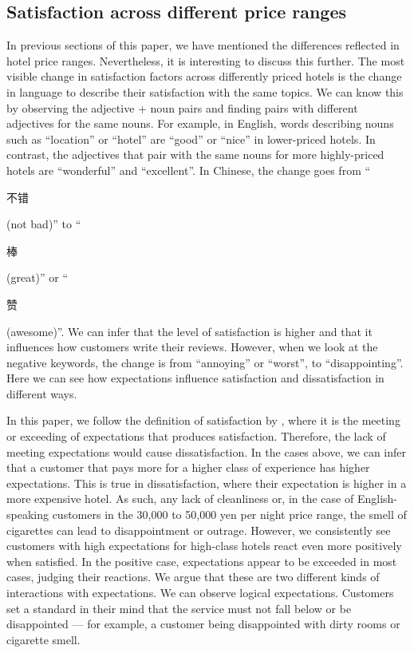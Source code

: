 \documentclass[smallextended,natbib]{svjour3}       %
\begin{document}
  \subsection{Satisfaction across different price ranges}\label{disc:price}

    In previous sections of this paper, we have mentioned the differences reflected in hotel price ranges. Nevertheless, it is interesting to discuss this further. The most visible change in satisfaction factors across differently priced hotels is the change in language to describe their satisfaction with the same topics. We can know this by observing the adjective + noun pairs and finding pairs with different adjectives for the same nouns. For example, in English, words describing nouns such as ``location'' or ``hotel'' are ``good'' or ``nice'' in lower-priced hotels. In contrast, the adjectives that pair with the same nouns for more highly-priced hotels are ``wonderful'' and ``excellent''. In Chinese, the change goes from ``\begin{CJK}{UTF8}{gbsn}不错\end{CJK} (not bad)'' to ``\begin{CJK}{UTF8}{gbsn}棒\end{CJK} (great)'' or ``\begin{CJK}{UTF8}{gbsn}赞\end{CJK} (awesome)''. We can infer that the level of satisfaction is higher and that it influences how customers write their reviews. However, when we look at the negative keywords, the change is from ``annoying'' or ``worst'', to ``disappointing''. Here we can see how expectations influence satisfaction and dissatisfaction in different ways. 

    In this paper, we follow the definition of satisfaction by \cite{hunt1975}, where it is the meeting or exceeding of expectations that produces satisfaction. Therefore, the lack of meeting expectations would cause dissatisfaction. In the cases above, we can infer that a customer that pays more for a higher class of experience has higher expectations. This is true in dissatisfaction, where their expectation is higher in a more expensive hotel. As such, any lack of cleanliness or, in the case of English-speaking customers in the 30,000 to 50,000 yen per night price range, the smell of cigarettes can lead to disappointment or outrage. However, we consistently see customers with high expectations for high-class hotels react even more positively when satisfied. In the positive case, expectations appear to be exceeded in most cases, judging their reactions. We argue that these are two different kinds of interactions with expectations. We can observe logical expectations. Customers set a standard in their mind that the service must not fall below or be disappointed — for example, a customer being disappointed with dirty rooms or cigarette smell.
\end{document}
